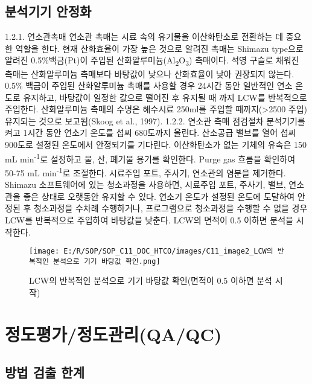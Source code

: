 \documentclass[
]{book}
\begin{document}
\hypertarget{uxbd84uxc11duxae30uxae30-uxc548uxc815uxd654}{%
\subsection{분석기기 안정화}\label{uxbd84uxc11duxae30uxae30-uxc548uxc815uxd654}}

1.2.1. 연소관촉매
연소관 촉매는 시료 속의 유기물을 이산화탄소로 전환하는 데 중요한 역할을 한다. 현재 산화효율이 가장 높은 것으로 알려진 촉매는 Shimazu type으로 알려진 0.5\%백금(Pt)이 주입된 산화알루미늄(Al\textsubscript{2}O\textsubscript{3}) 촉매이다. 석영 구슬로 채워진 촉매는 산화알루미늄 촉매보다 바탕값이 낮으나 산화효율이 낮아 권장되지 않는다. 0.5\% 백금이 주입된 산화알루미늄 촉매를 사용할 경우 24시간 동안 일반적인 연소 온도로 유지하고, 바탕값이 일정한 값으로 떨어진 후 유지될 때 까지 LCW를 반복적으로 주입한다. 산화알루미늄 촉매의 수명은 해수시료 250ml를 주입할 때까지(\textgreater2500 주입) 유지되는 것으로 보고됨(Skoog et al., 1997).
1.2.2. 연소관 촉매 점검절차
분석기기를 켜고 1시간 동안 연소기 온도를 섭씨 680도까지 올린다. 산소공급 밸브를 열어 섭씨 900도로 설정된 온도에서 안정되기를 기다린다. 이산화탄소가 없는 기체의 유속은 150 mL min\textsuperscript{-1}로 설정하고 물, 산, 폐기물 용기를 확인한다. Purge gas 흐름을 확인하여 50-75 mL min\textsuperscript{-1}로 조절한다.
시료주입 포트, 주사기, 연소관의 염분을 제거한다. Shimazu 소프트웨어에 있는 청소과정을 사용하면, 시료주입 포트, 주사기, 밸브, 연소관을 좋은 상태로 오랫동안 유지할 수 있다.
연소기 온도가 설정된 온도에 도달하여 안정된 후 청소과정을 수차례 수행하거나, 프로그램으로 청소과정을 수행할 수 없을 경우 LCW를 반복적으로 주입하여 바탕값을 낮춘다. LCW의 면적이 0.5 이하면 분석을 시작한다.

\begin{figure}
\centering
\texttt{[image: E:/R/SOP/SOP\_C11\_DOC\_HTCO/images/C11\_image2\_LCW의 반복적인 분석으로 기기 바탕값 확인.png]}
\caption{LCW의 반복적인 분석으로 기기 바탕값 확인(면적이 0.5 이하면 분석 시작)}
\end{figure}

\hypertarget{uxc815uxb3c4uxd3c9uxac00uxc815uxb3c4uxad00uxb9acqaqc-3}{%
\section{정도평가/정도관리(QA/QC)}\label{uxc815uxb3c4uxd3c9uxac00uxc815uxb3c4uxad00uxb9acqaqc-3}}

\hypertarget{uxbc29uxbc95-uxac80uxcd9c-uxd55cuxacc4}{%
\subsection{방법 검출 한계}\label{uxbc29uxbc95-uxac80uxcd9c-uxd55cuxacc4}}
\end{document}
